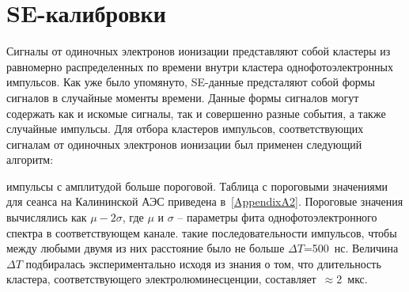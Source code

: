 \section{SE-калибровки}
\label{sect3_4}

Сигналы от одиночных электронов ионизации представляют собой кластеры из равномерно распределенных по времени внутри кластера однофотоэлектронных импульсов. Как уже было упомянуто, SE-данные предсталяют собой формы сигналов в случайные моменты времени. Данные формы сигналов могут содержать как и искомые сигналы, так и совершенно разные события, а также случайные импульсы. Для отбора кластеров импульсов, соответствующих сигналам от одиночных электронов ионизации был применен следующий алгоритм:
\begin{enumerate}
     импульсы с амплитудой больше пороговой. Таблица с пороговыми значениями для сеанса на Калининской АЭС приведена в~\ref{AppendixA2}. Пороговые значения вычислялись как $\mu-2\sigma$, где $\mu$ и $\sigma$ -- параметры фита однофотоэлектронного спектра в соответствующем канале.
     такие последовательности импульсов, чтобы между любыми двумя из них расстояние было не больше $\Delta T$=500~нс. Величина $\Delta T$ подбиралась экспериментально исходя из знания о том, что длительность кластера, соответствующего электролюминесценции, составляет~$\approx$2~мкс. 
\end{enumerate}


